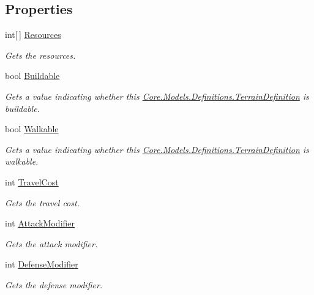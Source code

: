 \subsection*{Properties}
\begin{DoxyCompactItemize}
\item 
int\mbox{[}$\,$\mbox{]} \hyperlink{classCore_1_1Models_1_1Definitions_1_1TerrainDefinition_add68e1feb4cb4743c55e94474e69d872}{Resources}
\begin{DoxyCompactList}\small\item\em Gets the resources. \end{DoxyCompactList}\item 
bool \hyperlink{classCore_1_1Models_1_1Definitions_1_1TerrainDefinition_a7ea92cea864ec5076938847f78ecb186}{Buildable}
\begin{DoxyCompactList}\small\item\em Gets a value indicating whether this \hyperlink{classCore_1_1Models_1_1Definitions_1_1TerrainDefinition}{Core.\+Models.\+Definitions.\+Terrain\+Definition} is buildable. \end{DoxyCompactList}\item 
bool \hyperlink{classCore_1_1Models_1_1Definitions_1_1TerrainDefinition_a6811c8cb478e3c2cbbab24fbbd746e16}{Walkable}
\begin{DoxyCompactList}\small\item\em Gets a value indicating whether this \hyperlink{classCore_1_1Models_1_1Definitions_1_1TerrainDefinition}{Core.\+Models.\+Definitions.\+Terrain\+Definition} is walkable. \end{DoxyCompactList}\item 
int \hyperlink{classCore_1_1Models_1_1Definitions_1_1TerrainDefinition_aa1f619459353eedfb36c657b0eb370e7}{Travel\+Cost}
\begin{DoxyCompactList}\small\item\em Gets the travel cost. \end{DoxyCompactList}\item 
int \hyperlink{classCore_1_1Models_1_1Definitions_1_1TerrainDefinition_aa0bfc46b1779306a6bfb7c64eed5ebf1}{Attack\+Modifier}
\begin{DoxyCompactList}\small\item\em Gets the attack modifier. \end{DoxyCompactList}\item 
int \hyperlink{classCore_1_1Models_1_1Definitions_1_1TerrainDefinition_a2a06489b93795057da62a7fc004fa94f}{Defense\+Modifier}
\begin{DoxyCompactList}\small\item\em Gets the defense modifier. \end{DoxyCompactList}\end{DoxyCompactItemize}
